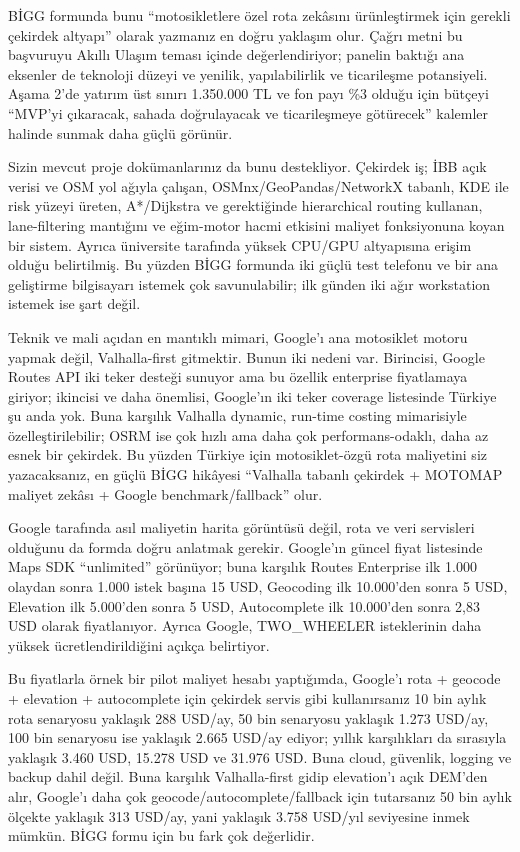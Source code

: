 \documentclass[varwidth=18cm, border=1cm]{standalone}
\begin{document}
BİGG formunda bunu “motosikletlere özel rota zekâsını ürünleştirmek için gerekli çekirdek altyapı” olarak yazmanız en doğru yaklaşım olur. Çağrı metni bu başvuruyu Akıllı Ulaşım teması içinde değerlendiriyor; panelin baktığı ana eksenler de teknoloji düzeyi ve yenilik, yapılabilirlik ve ticarileşme potansiyeli. Aşama 2’de yatırım üst sınırı 1.350.000 TL ve fon payı \%3 olduğu için bütçeyi “MVP’yi çıkaracak, sahada doğrulayacak ve ticarileşmeye götürecek” kalemler halinde sunmak daha güçlü görünür.

Sizin mevcut proje dokümanlarınız da bunu destekliyor. Çekirdek iş; İBB açık verisi ve OSM yol ağıyla çalışan, OSMnx/GeoPandas/NetworkX tabanlı, KDE ile risk yüzeyi üreten, A*/Dijkstra ve gerektiğinde hierarchical routing kullanan, lane-filtering mantığını ve eğim-motor hacmi etkisini maliyet fonksiyonuna koyan bir sistem. Ayrıca üniversite tarafında yüksek CPU/GPU altyapısına erişim olduğu belirtilmiş. Bu yüzden BİGG formunda iki güçlü test telefonu ve bir ana geliştirme bilgisayarı istemek çok savunulabilir; ilk günden iki ağır workstation istemek ise şart değil.

Teknik ve mali açıdan en mantıklı mimari, Google’ı ana motosiklet motoru yapmak değil, Valhalla-first gitmektir. Bunun iki nedeni var. Birincisi, Google Routes API iki teker desteği sunuyor ama bu özellik enterprise fiyatlamaya giriyor; ikincisi ve daha önemlisi, Google’ın iki teker coverage listesinde Türkiye şu anda yok. Buna karşılık Valhalla dynamic, run-time costing mimarisiyle özelleştirilebilir; OSRM ise çok hızlı ama daha çok performans-odaklı, daha az esnek bir çekirdek. Bu yüzden Türkiye için motosiklet-özgü rota maliyetini siz yazacaksanız, en güçlü BİGG hikâyesi “Valhalla tabanlı çekirdek + MOTOMAP maliyet zekâsı + Google benchmark/fallback” olur.

Google tarafında asıl maliyetin harita görüntüsü değil, rota ve veri servisleri olduğunu da formda doğru anlatmak gerekir. Google’ın güncel fiyat listesinde Maps SDK “unlimited” görünüyor; buna karşılık Routes Enterprise ilk 1.000 olaydan sonra 1.000 istek başına 15 USD, Geocoding ilk 10.000’den sonra 5 USD, Elevation ilk 5.000’den sonra 5 USD, Autocomplete ilk 10.000’den sonra 2,83 USD olarak fiyatlanıyor. Ayrıca Google, TWO\_WHEELER isteklerinin daha yüksek ücretlendirildiğini açıkça belirtiyor.

Bu fiyatlarla örnek bir pilot maliyet hesabı yaptığımda, Google’ı rota + geocode + elevation + autocomplete için çekirdek servis gibi kullanırsanız 10 bin aylık rota senaryosu yaklaşık 288 USD/ay, 50 bin senaryosu yaklaşık 1.273 USD/ay, 100 bin senaryosu ise yaklaşık 2.665 USD/ay ediyor; yıllık karşılıkları da sırasıyla yaklaşık 3.460 USD, 15.278 USD ve 31.976 USD. Buna cloud, güvenlik, logging ve backup dahil değil. Buna karşılık Valhalla-first gidip elevation’ı açık DEM’den alır, Google’ı daha çok geocode/autocomplete/fallback için tutarsanız 50 bin aylık ölçekte yaklaşık 313 USD/ay, yani yaklaşık 3.758 USD/yıl seviyesine inmek mümkün. BİGG formu için bu fark çok değerlidir.
\end{document}
